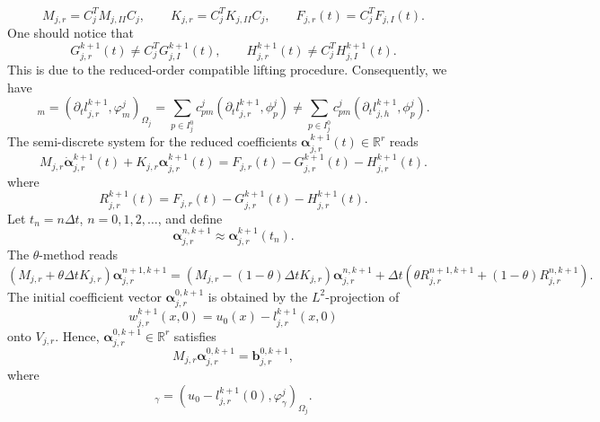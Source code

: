 \documentclass[a4paper, 11pt]{article}
\theoremstyle{remark}
\begin{document}
\begin{equation*}
    M_{j,r} = C_j^T M_{j, II} C_j, \qquad K_{j,r} = C_j^T K_{j, II} C_j, \qquad F_{j,r}(t) = C_j^T F_{j, I}(t).
\end{equation*}
One should notice that 
\begin{equation*}
    G_{j,r}^{k+1}(t) \neq C_j^T G_{j, I}^{k+1}(t), \qquad H_{j,r}^{k+1}(t) \neq C_j^T H_{j, I}^{k+1}(t).
\end{equation*}
This is due to the reduced-order compatible lifting procedure. Consequently, we have
\begin{equation*}
    [G_{j,r}^{k+1}(t)]_{m} = (\partial_t l_{j, r}^{k+1}, \varphi_{m}^{j})_{\Omega_j} = \sum_{p \in I^{0}_{j}} c^{j}_{pm}(\partial_t l_{j, r}^{k+1}, \phi^{j}_{p}) \neq \sum_{p \in I^{0}_{j}} c^{j}_{pm}(\partial_t l_{j, h}^{k+1}, \phi^{j}_{p}).
\end{equation*}
The semi-discrete system for the reduced coefficients $\boldsymbol{\alpha}_{j, r}^{k+1}(t) \in \mathbb{R}^{r}$ reads
\begin{equation*}
    M_{j, r} \dot{\boldsymbol{\alpha}}_{j, r}^{k+1}(t) + K_{j, r} \boldsymbol{\alpha}_{j, r}^{k+1}(t) = F_{j, r}(t) - G_{j, r}^{k+1}(t) - H_{j, r}^{k+1}(t). 
\end{equation*}
where
\begin{equation*}
     R^{k+1}_{j, r}(t) =  F_{j, r}(t) - G_{j, r}^{k+1}(t) - H_{j, r}^{k+1}(t).
\end{equation*}
Let $t_n = n \Delta t$, $n=0,1,2,\dots$, and define
\begin{equation*}
    \boldsymbol{\alpha}_{j, r}^{n, k+1} \approx \boldsymbol{\alpha}_{j, r}^{k+1}(t_n).    
\end{equation*}
The $\theta$-method reads
\begin{equation*}
    \left(M_{j, r} + \theta\Delta t K_{j, r}\right) \boldsymbol{\alpha}_{j, r}^{n+1, k+1} = \left(M_{j, r} - (1-\theta)\Delta t K_{j, r}\right)\boldsymbol{\alpha}_{j, r}^{n, k+1} + \Delta t\left(\theta R^{n+1, k+1}_{j, r} + (1-\theta)R^{n, k+1}_{j, r}\right).
\end{equation*}
The initial coefficient vector $\boldsymbol{\alpha}_{j, r}^{0,k+1}$ is obtained by the $L^2$-projection of 
\begin{equation*}
    w_{j,r}^{k+1}(x, 0) = u_0(x) - l_{j, r}^{k+1}(x,0)
\end{equation*}
onto $V_{j,r}$. Hence, $\boldsymbol{\alpha}_{j, r}^{0, k+1} \in \mathbb{R}^{r}$ satisfies
\begin{equation*}
    M_{j, r} \boldsymbol{\alpha}_{j, r}^{0,k+1} = \mathbf{b}_{j, r}^{0,k+1},
\end{equation*}
where
\begin{equation*}
    [\mathbf{b}_{j, r}^{0,k+1}]_{\gamma} = (u_0 - l_{j, r}^{k+1}(0), \varphi_{\gamma}^{j})_{\Omega_j}.
\end{equation*}
\end{document}
